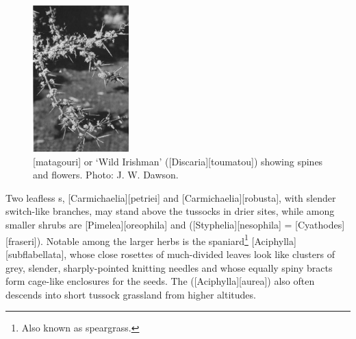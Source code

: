 \begin{figure}
	\includegraphics[width=0.33\textwidth]{graphics/figure83matagouri.jpg}
	\centering
	\caption[Matagouri]{[matagouri] or `Wild Irishman' ([Discaria][toumatou]) showing spines and flowers.
	Photo:  J. W. Dawson.}%
	\label{fig:83matagouri}
\end{figure}

Two leafless s, [Carmichaelia][petriei] and [Carmichaelia][robusta], with slender switch-like branches, may stand above the tussocks in drier sites, while among smaller shrubs are [Pimelea][oreophila] and  ([Styphelia][nesophila] = [Cyathodes][fraseri]).
Notable among the larger herbs is the spaniard\footnote{Also known as speargrass.} [Aciphylla][subflabellata], whose close rosettes of much-divided leaves look like clusters of grey, slender, sharply-pointed knitting needles and whose equally spiny bracts form cage-like enclosures for the seeds.
The  ([Aciphylla][aurea]) also often descends into short tussock grassland from higher altitudes.

